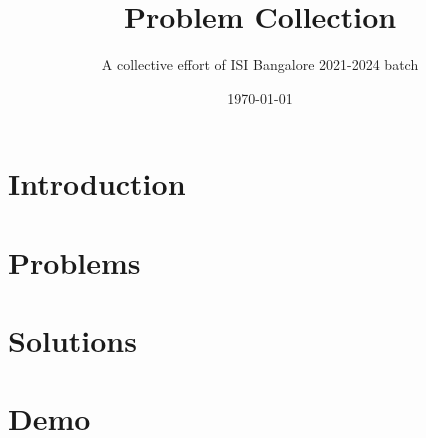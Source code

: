 \documentclass[10pt, a4paper]{article}
\title{{\Huge Problem Collection} \vspace{0.5cm}}
\author{A collective effort of ISI Bangalore 2021-2024 batch}
\date{\today}
\begin{document}
\maketitle

\tableofcontents

\section{Introduction}

\newpage

\section{Problems}


\newpage

\section{Solutions}


\newpage

\section{Demo}

\end{document}
